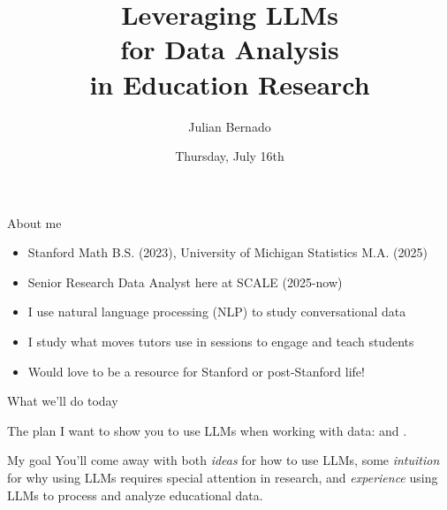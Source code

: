 \documentclass[aspectratio=169,t]{beamer}
\title{Leveraging LLMs\\for Data Analysis\\in Education Research}
\subtitle{}
\author{Julian Bernado}
\institute{SCALE Initiative, Stanford University}
\date{Thursday, July 16th}
\begin{document}
\begin{frame}
  \titlepage
\end{frame}

\begin{frame}{About me}
    \vspace{0.5em}
    \begin{itemize}
        \itemsep=1.0em
        \item Stanford Math B.S. (2023), University of Michigan Statistics
              M.A. (2025)
        \item Senior Research Data Analyst here at SCALE (2025-now)
        \item I use natural language processing (NLP) to study
              conversational data
        \item I study what moves tutors use in sessions to engage and teach students
        \item Would love to be a resource for Stanford or post-Stanford life!
    \end{itemize}
\end{frame}

\begin{frame}{What we'll do today}

    \begin{block}{The plan}
        I want to show you \textbf{} to use LLMs when working with data: \textbf{} and \textbf{}.
    \end{block}
    \vspace{0.5em}
    \begin{alertblock}{My goal}
        You'll come away with both \emph{ideas} for how to use LLMs, some
        \emph{intuition} for why using LLMs requires special attention in
        research, and \textit{experience} using LLMs to process and analyze educational data.
    \end{alertblock}
\end{frame}
\end{document}
